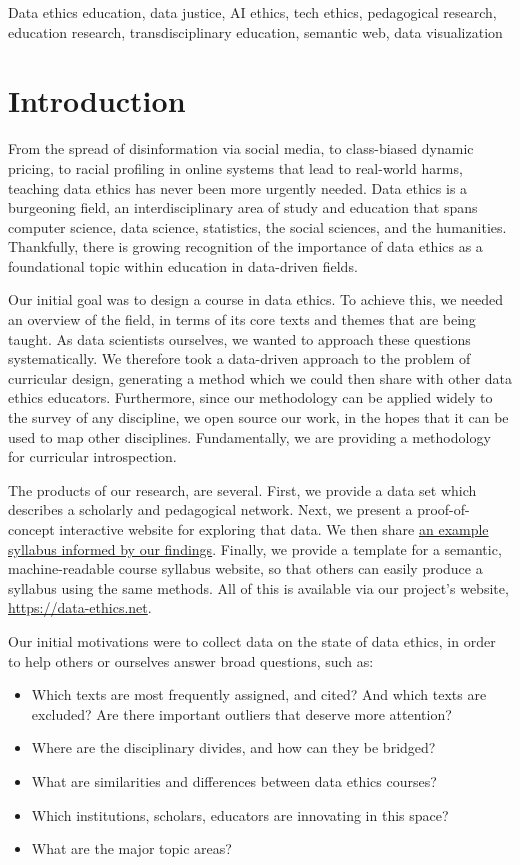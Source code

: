 \documentclass[
]{article}
\providecommand{\tightlist}{%
  \setlength{\itemsep}{0pt}\setlength{\parskip}{0pt}}
\begin{document}
Data ethics education, data justice, AI ethics, tech ethics, pedagogical
research, education research, transdisciplinary education, semantic web,
data visualization

\hypertarget{introduction}{%
\section{Introduction}\label{introduction}}

From the spread of disinformation via social media, to class-biased
dynamic pricing, to racial profiling in online systems that lead to
real-world harms, teaching data ethics has never been more urgently
needed. Data ethics is a burgeoning field, an interdisciplinary area of
study and education that spans computer science, data science,
statistics, the social sciences, and the humanities. Thankfully, there
is growing recognition of the importance of data ethics as a
foundational topic within education in data-driven fields.

Our initial goal was to design a course in data ethics. To achieve this,
we needed an overview of the field, in terms of its core texts and
themes that are being taught. As data scientists ourselves, we wanted to
approach these questions systematically. We therefore took a data-driven
approach to the problem of curricular design, generating a method which
we could then share with other data ethics educators. Furthermore, since
our methodology can be applied widely to the survey of any discipline,
we open source our work, in the hopes that it can be used to map other
disciplines. Fundamentally, we are providing a methodology for
curricular introspection.

The products of our research, are several. First, we provide a data set
which describes a scholarly and pedagogical network. Next, we present a
proof-of-concept interactive website for exploring that data. We then
share \href{http://data-ethics.jonreeve.com/}{an example syllabus
informed by our findings}. Finally, we provide a template for a
semantic, machine-readable course syllabus website, so that others can
easily produce a syllabus using the same methods. All of this is
available via our project's website, \url{https://data-ethics.net}.

Our initial motivations were to collect data on the state of data
ethics, in order to help others or ourselves answer broad questions,
such as:

\begin{itemize}
\tightlist
\item
  Which texts are most frequently assigned, and cited? And which texts
  are excluded? Are there important outliers that deserve more
  attention?
\item
  Where are the disciplinary divides, and how can they be bridged?
\item
  What are similarities and differences between data ethics courses?
\item
  Which institutions, scholars, educators are innovating in this space?
\item
  What are the major topic areas?
\end{itemize}
\end{document}
